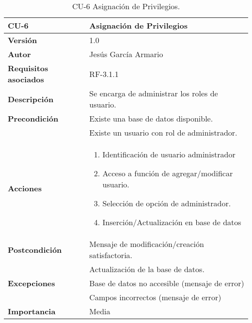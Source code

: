 \begin{table}[p]
	\centering
	\begin{tabularx}{\linewidth}{ p{} p{} }
		\toprule
		\textbf{CU-6}    & \textbf{Asignación de Privilegios}\\
		\toprule
		\textbf{Versión}              & 1.0    \\
		\textbf{Autor}                & Jesús García Armario \\
		\textbf{Requisitos asociados} & RF-3.1.1 \\
		\textbf{Descripción}          & Se encarga de administrar los roles de usuario. \\
		\textbf{Precondición}         & Existe una base de datos disponible. \\
  & Existe un usuario con rol de administrador.\\
		\textbf{Acciones}             &
		\begin{enumerate}
			\def\labelenumi{\arabic{enumi}.}
			\tightlist
			\item Identificación de usuario administrador
   \item Acceso a función de agregar/modificar usuario.
   \item Selección de opción de administrador.
   \item Inserción/Actualización en base de datos
\end{enumerate}\\
		\textbf{Postcondición}        &  Mensaje de modificación/creación satisfactoria. \\
  & Actualización de la base de datos.\\
		\textbf{Excepciones}          & Base de datos no accesible (mensaje de error)\\
  & Campos incorrectos (mensaje de error)\\
		\textbf{Importancia}          & Media \\
		\bottomrule
	\end{tabularx}
	\caption{CU-6 Asignación de Privilegios.}
 \end{table}

